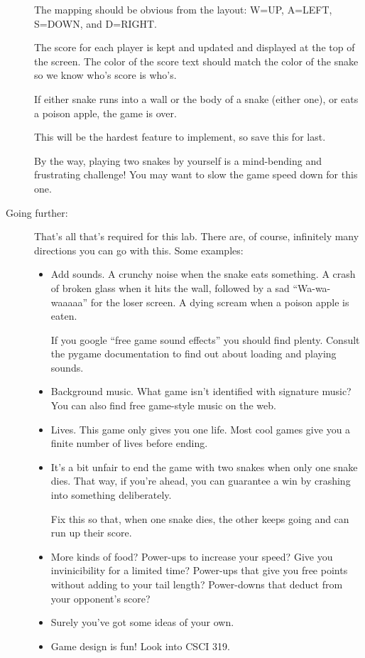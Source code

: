 \documentclass[12pt]{article}
\begin{document}
\begin{description}
The mapping should be obvious from the layout:  W=UP,
A=LEFT, S=DOWN, and D=RIGHT.

The score for each player is kept and updated and displayed
at the top of the screen.  The color of the score text
should match the color of the snake so we know who's score is who's.

If either snake runs into a wall or the body of a snake
(either one), or eats a poison apple, the game is over.

This will be the hardest feature to implement, so save
this for last.

By the way, playing two snakes by yourself is a mind-bending
and frustrating challenge!  You may want to slow the game
speed down for this one.

\item[Going further:]  That's all that's required for this lab.
There are, of course, infinitely many directions you can go
with this.  Some examples:
\begin{itemize}
\item Add sounds.  A crunchy noise when the snake eats something.
A crash of broken glass when it hits the wall, followed by
a sad ``Wa-wa-waaaaa'' for the loser screen.  A dying scream
when a poison apple is eaten.

If you google ``free game sound effects'' you should find plenty.
Consult the pygame documentation to find out about loading and 
playing sounds.

\item Background music.  What game isn't identified with signature
music?  You can also find free game-style music on the web.

\item Lives.  This game only gives you one life.  Most cool
games give you a finite number of lives before ending.

\item It's a bit unfair to end the game with two snakes when
only one snake dies.  That way, if you're ahead, you can 
guarantee a win by crashing into something deliberately.

Fix this so that, when one snake dies, the other keeps going
and can run up their score.

\item More kinds of food?  Power-ups to increase your speed?
Give you invinicibility for a limited time?  Power-ups that give
you free points without adding to your tail length?  Power-downs
that deduct from your opponent's score?

\item Surely you've got some ideas of your own. 

\item Game design is fun!
Look into CSCI 319.
\end{itemize}




\end{description}
\end{document}
